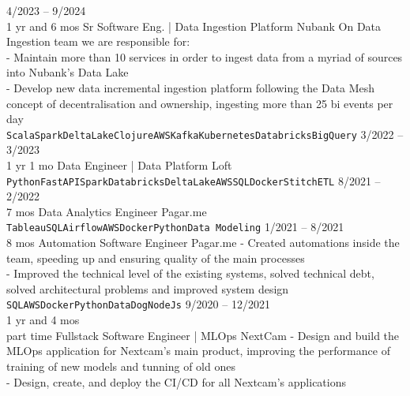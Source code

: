 \documentclass[9pt]{developercv} %
\begin{document}
\begin{entrylist}
	\entry
		{4/2023 -- 9/2024 \\\footnotesize{1 yr and 6 mos}}
		{Sr Software Eng. | Data Ingestion Platform}
		{Nubank}
		{
On Data Ingestion team we are responsible for:
\\ - Maintain more than 10 services in order to ingest data from a myriad of sources into Nubank's Data Lake
\\- Develop new data incremental ingestion platform following the Data Mesh concept of decentralisation and ownership, ingesting more than 25 bi events per day
\\\texttt{Scala}\slashsep\texttt{Spark}\slashsep\texttt{DeltaLake}\slashsep\texttt{Clojure}\slashsep\texttt{AWS}\slashsep\texttt{Kafka}\slashsep\texttt{Kubernetes}\slashsep\texttt{Databricks}\slashsep\texttt{BigQuery}}
	\entry
		{3/2022 -- 3/2023 \\\footnotesize{1 yr 1 mo}}
		{Data Engineer | Data Platform}
		{Loft}	{\texttt{Python}\slashsep\texttt{FastAPI}\slashsep\texttt{Spark}\slashsep\texttt{Databricks}\slashsep\texttt{DeltaLake}\slashsep\texttt{AWS}\slashsep\texttt{SQL}\slashsep\texttt{Docker}\slashsep\texttt{StitchETL}}
	\entry
		{8/2021 -- 2/2022 \\\footnotesize{7 mos}}
		{Data Analytics Engineer}
		{Pagar.me}
		{
\\\texttt{Tableau}\slashsep\texttt{SQL}\slashsep\texttt{Airflow}\slashsep\texttt{AWS}\slashsep\texttt{Docker}\slashsep\texttt{Python}\slashsep\texttt{Data Modeling}}
	\entry
		{1/2021 -- 8/2021 \\\footnotesize{8 mos}}
		{Automation Software Engineer}
		{Pagar.me}
		{- Created automations inside the team, speeding up and ensuring quality of the main processes \\
  - Improved the technical level of the existing systems, solved technical debt, solved architectural problems and improved system design
\\\slashsep\texttt{SQL}\slashsep\texttt{AWS}\slashsep\texttt{Docker}\slashsep\texttt{Python}\slashsep\texttt{DataDog}\slashsep\texttt{NodeJs}}
	\entry
		{9/2020 -- 12/2021\\\footnotesize{1 yr and 4 mos\\part time}}
		{Fullstack Software Engineer | MLOps}
		{NextCam}
		{- Design and build the MLOps application for Nextcam's main product, improving the performance of training of new models and tunning of old ones\\
- Design, create, and deploy the CI/CD for all Nextcam's applications\\
}
\end{entrylist}
\end{document}
